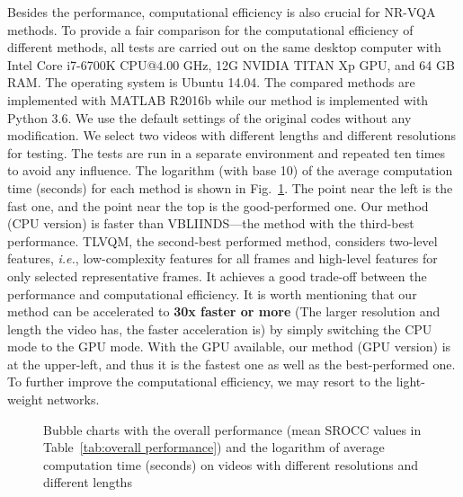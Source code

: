 \documentclass[twocolumn]{svjour3}          \smartqed  \usepackage{graphicx}
\begin{document}
Besides the performance, computational efficiency is also crucial for NR-VQA methods. 
To provide a fair comparison for the computational efficiency of different methods, all tests are carried out on the same desktop computer with Intel Core i7-6700K CPU@4.00 GHz, 12G NVIDIA TITAN Xp GPU, and 64 GB RAM. 
The operating system is Ubuntu 14.04. 
The compared methods are implemented with MATLAB R2016b while our method is implemented with Python 3.6. 
We use the default settings of the original codes without any modification. 
We select two videos with different lengths and different resolutions for testing. 
The tests are run in a separate environment and repeated ten times to avoid any influence. 
The logarithm (with base 10) of the average computation time (seconds) for each method is shown in Fig.~\ref{fig:time}. 
The point near the left is the fast one, and the point near the top is the good-performed one. 
Our method (CPU version) is faster than VBLIINDS---the method with the third-best performance. 
TLVQM, the second-best performed method, considers two-level features, \textit{i.e.}, low-complexity features for all frames and high-level features for only selected representative frames.  
It achieves a good trade-off between the performance and computational efficiency.
It is worth mentioning that our method can be accelerated to \textbf{30x faster or more} (The larger resolution and length the video has, the faster acceleration is) by simply switching the CPU mode to the GPU mode. 
With the GPU available, our method (GPU version) is at the upper-left, and thus it is the fastest one as well as the best-performed one.
To further improve the computational efficiency, we may resort to the light-weight networks.

\begin{figure}[!thb]
    \centering
    
    \caption{Bubble charts with the overall performance (mean SROCC values in Table~\ref{tab:overall performance}) and the logarithm of average computation time (seconds) on videos with different resolutions and different lengths}
    \label{fig:time}
\end{figure}
\end{document}
